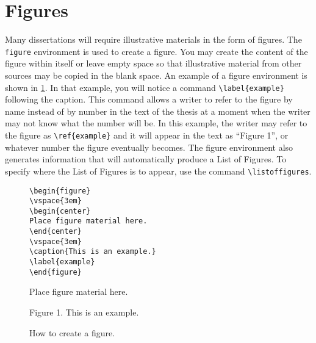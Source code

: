 \section{Figures}
Many dissertations will require illustrative materials in the form of
figures.
The \verb+figure+ environment is used to create a figure.
You may create the content of the figure within \uicthesi{} itself
or leave empty space so that illustrative material from other sources
may be copied in the blank space.
An example of a figure environment is shown in \ref{fig:fig}.
In that example, you will notice a command
\verb+\label{example}+ following the caption.
This command allows a writer to refer to the figure by name instead of
by number in the text of the thesis at a moment when the writer may not
know what the number will be.
In this example, the writer may refer to the figure as
\verb+\ref{example}+ and it will appear in the text as ``Figure 1'',
or whatever number the figure eventually becomes.
The figure environment also generates information that will automatically
produce a List of Figures.
To specify where the List of Figures is to appear, use the command
\verb+\listoffigures+.
\begin{figure}
\footnotesize
\begin{minipage}[t]{0.48\textwidth}
\begin{verbatim}
\begin{figure}
\vspace{3em}
\begin{center}
Place figure material here.
\end{center}
\vspace{3em}
\caption{This is an example.}
\label{example}
\end{figure}
\end{verbatim}
\end{minipage}\hfill
\begin{minipage}[t]{0.48\textwidth}
\vspace{3em}
\begin{center}
Place figure material here.
\end{center}
\vspace{3em}
\begin{center}
Figure 1. This is an example.
\end{center}
\end{minipage}
\vspace{1em}
\caption{How to create a figure.}
\label{fig:fig}
\end{figure}
 
